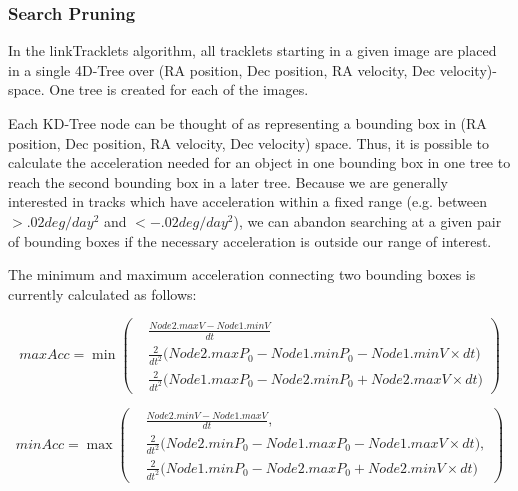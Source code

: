 \subsubsection{Search Pruning}
\label{searchPruning}
In the linkTracklets algorithm, all tracklets starting in a given
image are placed in a single 4D-Tree over (RA position, Dec position,
RA velocity, Dec velocity)-space.  One tree is created for each of the
images.

Each KD-Tree node can be thought of as representing a bounding box in (RA
position, Dec position, RA velocity, Dec velocity) space.  Thus, it is
possible to calculate the acceleration needed for an object in one
bounding box in one tree to reach the second bounding box in a later
tree.  Because we are generally interested in tracks which have
acceleration within a fixed range (e.g. between $>.02 deg/day^2$ and
$<-.02 deg/day^2$), we can abandon searching at a given pair of
bounding boxes if the necessary acceleration is outside our range of
interest.

The minimum and maximum acceleration connecting two bounding boxes is
currently calculated as follows:


\begin{equation}
maxAcc = \min  \left(\begin{array}{ccc} & \displaystyle \frac{Node2.maxV - Node1.minV}{dt} \\
& \displaystyle \frac{2}{dt^2} \bigg(Node2.maxP_0 - Node1.minP_0 - Node1.minV \times dt \bigg) \\
& \displaystyle \frac{2}{dt^2} \bigg(Node1.maxP_0 - Node2.minP_0 + Node2.maxV \times dt \bigg) \end{array}\right)
\end{equation}

\begin{equation}
minAcc  = \max  \left(\begin{array}{ccc} & \displaystyle \frac{Node2.minV - Node1.maxV}{dt},\\
& \displaystyle \frac{2}{dt^2} \bigg( Node2.minP_0 - Node1.maxP_0 - \displaystyle Node1.maxV \times dt\bigg), \\
& \displaystyle \frac{2}{dt^2} \bigg(Node1.minP_0 - Node2.maxP_0 + Node2.minV \times dt\bigg) \end{array} \right)
\end{equation}


